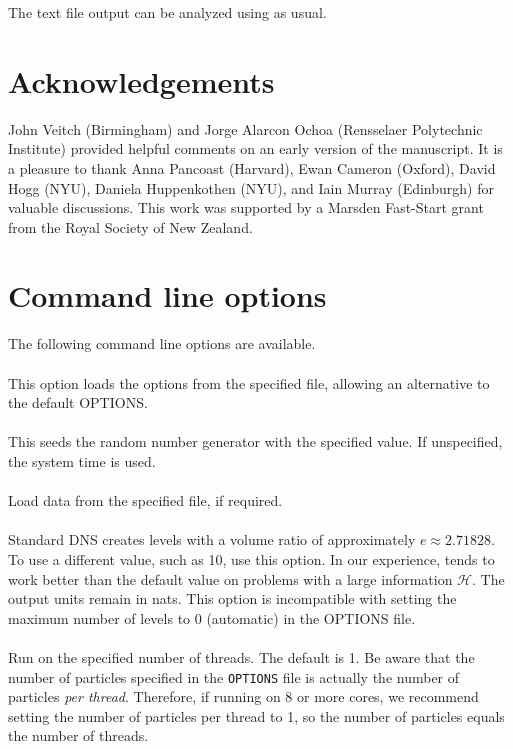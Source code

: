 \documentclass[article, nojss]{jss}
\begin{document}
The text file output can be analyzed using 
as usual.

\section*{Acknowledgements}
John Veitch (Birmingham)
and Jorge Alarcon Ochoa (Rensselaer Polytechnic Institute)
provided helpful comments on an early
version of the manuscript.
It is a pleasure to thank Anna Pancoast (Harvard),
Ewan Cameron (Oxford), David Hogg (NYU), Daniela Huppenkothen (NYU),
and Iain Murray (Edinburgh)
for valuable discussions. This work was supported by a Marsden Fast-Start grant
from the Royal Society of New Zealand.



\appendix
\section{Command line options}\label{sec:command_line_options}
The following command line options are available.\\

\\
This option loads the  options from the specified file, allowing
an alternative to the default OPTIONS.\\

\\
This seeds the random number generator with the specified value. If unspecified, the system time is used.\\

\\
Load data from the specified file, if required.\\

\\
Standard DNS creates levels with a volume ratio of approximately
$e\approx 2.71828$. To use a different value, such as 10, use this option.
In our experience,  tends to work better than the default
value on problems with a large information $\mathcal{H}$.
The output units remain in nats.
This option is incompatible with setting the maximum number of levels to 0
(automatic) in the OPTIONS file.
\\

\\
Run on the specified number of threads. The default is 1.
Be aware that the number of particles specified in the {\tt OPTIONS}
file is actually the number of particles {\em per thread}. Therefore,
if running on 8 or more cores, we recommend setting the number of particles
per thread to 1, so the number of particles equals the number of threads.
\end{document}
